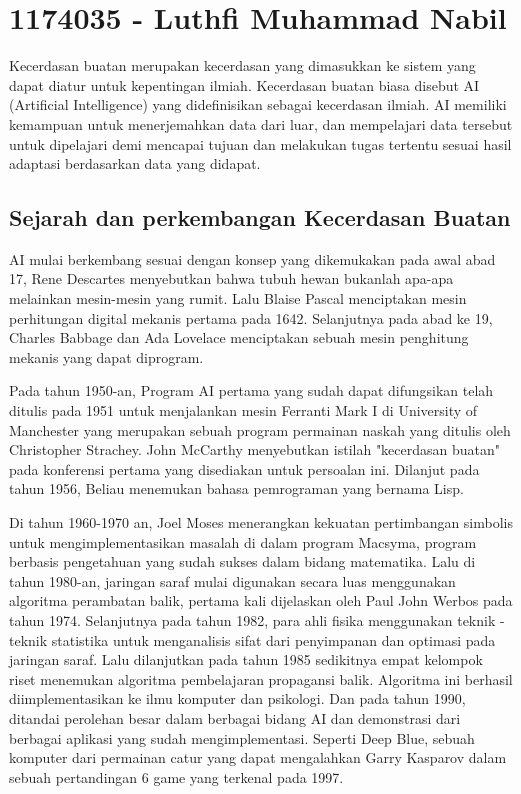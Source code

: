 \section{1174035 - Luthfi Muhammad Nabil}
Kecerdasan buatan merupakan kecerdasan yang dimasukkan ke sistem yang dapat diatur untuk kepentingan ilmiah. Kecerdasan buatan biasa disebut AI (Artificial Intelligence) yang didefinisikan sebagai kecerdasan ilmiah. AI memiliki kemampuan untuk menerjemahkan data dari luar, dan mempelajari data tersebut untuk dipelajari demi mencapai tujuan dan melakukan tugas tertentu sesuai hasil adaptasi berdasarkan data yang didapat. 

\subsection{Sejarah dan perkembangan Kecerdasan Buatan}
AI mulai berkembang sesuai dengan konsep yang dikemukakan pada awal abad 17, Rene Descartes menyebutkan bahwa tubuh hewan bukanlah apa-apa melainkan mesin-mesin yang rumit. Lalu Blaise Pascal menciptakan mesin perhitungan digital mekanis pertama pada 1642. Selanjutnya pada abad ke 19, Charles Babbage dan Ada Lovelace menciptakan sebuah mesin penghitung mekanis yang dapat diprogram.

Pada tahun 1950-an, Program AI pertama yang sudah dapat difungsikan telah ditulis pada 1951 untuk menjalankan mesin Ferranti Mark I di University of Manchester yang merupakan sebuah program permainan naskah yang ditulis oleh Christopher Strachey. John McCarthy menyebutkan istilah "kecerdasan buatan" pada konferensi pertama yang disediakan untuk persoalan ini. Dilanjut pada tahun 1956, Beliau menemukan bahasa pemrograman yang bernama Lisp.

Di tahun 1960-1970 an, Joel Moses menerangkan kekuatan pertimbangan simbolis untuk mengimplementasikan masalah di dalam program Macsyma, program berbasis pengetahuan yang sudah sukses dalam bidang matematika. Lalu di tahun 1980-an, jaringan saraf mulai digunakan secara luas menggunakan algoritma perambatan balik, pertama kali dijelaskan oleh Paul John Werbos pada tahun 1974. Selanjutnya pada tahun 1982, para ahli fisika menggunakan teknik - teknik statistika untuk menganalisis sifat dari penyimpanan dan optimasi pada jaringan saraf. Lalu dilanjutkan pada tahun 1985 sedikitnya empat kelompok riset menemukan algoritma pembelajaran propagansi balik. Algoritma ini berhasil diimplementasikan ke ilmu komputer dan psikologi. Dan pada tahun 1990, ditandai perolehan besar dalam berbagai bidang AI dan demonstrasi dari berbagai aplikasi yang sudah mengimplementasi. Seperti Deep Blue, sebuah komputer dari permainan catur yang dapat mengalahkan Garry Kasparov dalam sebuah pertandingan 6 game yang terkenal pada 1997. 

